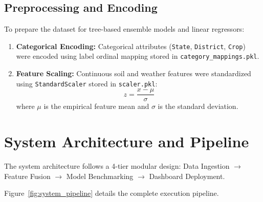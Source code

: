 \documentclass[11pt,a4paper]{article}
\begin{document}
\subsection{Preprocessing and Encoding}
To prepare the dataset for tree-based ensemble models and linear regressors:
\begin{enumerate}
    \item \textbf{Categorical Encoding:} Categorical attributes (\texttt{State}, \texttt{District}, \texttt{Crop}) were encoded using label ordinal mapping stored in \texttt{category\_mappings.pkl}.
    \item \textbf{Feature Scaling:} Continuous soil and weather features were standardized using \texttt{StandardScaler} stored in \texttt{scaler.pkl}:
    \begin{equation}
        z = \frac{x - \mu}{\sigma}
    \end{equation}
    where $\mu$ is the empirical feature mean and $\sigma$ is the standard deviation.
\end{enumerate}

\section{System Architecture and Pipeline}
\label{sec:architecture}

The system architecture follows a 4-tier modular design: Data Ingestion $\rightarrow$ Feature Fusion $\rightarrow$ Model Benchmarking $\rightarrow$ Dashboard Deployment.

Figure~\ref{fig:system_pipeline} details the complete execution pipeline.
\end{document}
